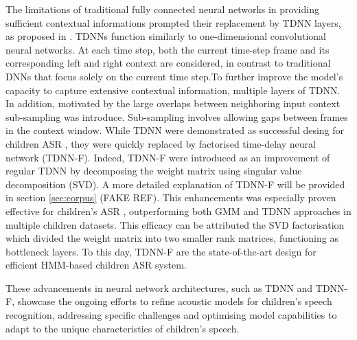 The limitations of traditional fully connected neural networks in providing sufficient contextual informations prompted their replacement by TDNN layers, as proposed in \cite{tdnn}. TDNNs function similarly to one-dimensional convolutional neural networks. At each time step, both the current time-step frame and its corresponding left and right context are considered, in contrast to traditional DNNs that focus solely on the current time step.To further improve the model's capacity to capture extensive contextual information, multiple layers of TDNN. In addition, motivated by the large overlaps between neighboring input context sub-sampling was introduce. Sub-sampling involves allowing gaps between frames in the context window. 
While TDNN were demonstrated as successful desing for children ASR \cite{kumar2020leveraging}, they were quickly replaced by factorised time-delay neural network (TDNN-F). Indeed, TDNN-F were introduced as an improvement of regular TDNN \cite{TDNN-F} by decomposing the weight matrix using singular value decomposition (SVD). A more detailed explanation of TDNN-F will be provided in section \ref{sec:corpus} (FAKE REF). This enhancements was especially proven effective for children's ASR \cite{tdnnf-children}, outperforming both GMM and TDNN approaches in multiple children datasets. This efficacy can be attributed the SVD factorisation which divided the weight matrix into two smaller rank matrices, functioning as bottleneck layers. To this day, TDNN-F are the state-of-the-art design for efficient HMM-based children ASR system.

These advancements in neural network architectures, such as TDNN and TDNN-F, showcase the ongoing efforts to refine acoustic models for children's speech recognition, addressing specific challenges and optimising model capabilities to adapt to the unique characteristics of children's speech.



